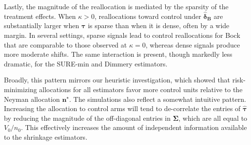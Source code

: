 \documentclass{article}
\newcommand{\bstau}{\boldsymbol \tau}
\newcommand{\hbstau}{\boldsymbol{\hat \tau}}
\newcommand{\bsSig}{\boldsymbol  \Sigma}
\newcommand{\bsdeltb}{\boldsymbol {\hat \delta_B}}
\begin{document}
Lastly, the magnitude of the reallocation is mediated by the sparsity of the treatment effects. When $\kappa>0$, reallocations toward control under $\bsdeltb$ are substantially larger when $\bstau$ is sparse than when it is dense, often by a wide margin. In several settings, sparse signals lead to control reallocations for Bock that are comparable to those observed at $\kappa=0$, whereas dense signals produce more moderate shifts. The same interaction is present, though markedly less dramatic, for the SURE-min and Dimmery estimators. 

Broadly, this pattern mirrors our heuristic investigation, which showed that risk-minimizing allocations for all estimators favor more control units relative to the Neyman allocation $\boldsymbol{n^\star}$. The simulations also reflect a somewhat intuitive pattern. Increasing the allocation to control arms will tend to de-correlate the entries of $\hbstau$ by reducing the magnitude of the off-diagonal entries in $\bsSig$, which are all equal to $V_0/n_0$. This effectively increases the amount of independent information available to the shrinkage estimators.




\end{document}
